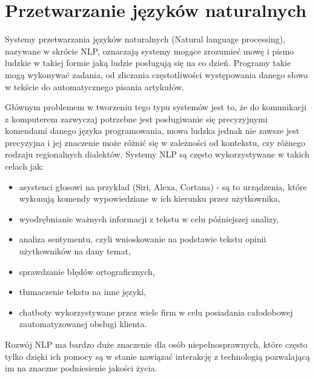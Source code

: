 
\chapter{Przetwarzanie języków naturalnych}
Systemy przetwarzania języków naturalnych (Natural language processing), nazywane 
w skrócie NLP, oznaczają systemy mogące zrozumieć mowę i pismo ludzkie w takiej
formie jaką ludzie posługują się na co dzień. Programy takie mogą wykonywać zadania, od zliczania
częstotliwości występowania danego słowa w tekście do automatycznego pisania artykułów. 

Głównym problemem w tworzeniu tego typu systemów jest to, że do komunikacji z komputerem zazwyczaj
potrzebne jest posługiwanie się precyzyjnymi komendami danego języka programowania, mowa ludzka
jednak nie zawsze jest precyzyjna i jej znaczenie może różnić się w zależności od kontekstu, czy
różnego rodzaju regionalnych dialektów. Systemy NLP są często wykorzystywane w takich 
celach jak:
\begin{itemize}
    \item asystenci głosowi na przykład (Siri, Alexa, Cortana) - są to urządzenia, które 
    wykonują komendy wypowiedziane w ich kierunku przez użytkownika,
    \item wyodrębnianie ważnych informacji z tekstu w celu późniejszej analizy,
    \item analiza sentymentu, czyli wnioskowanie na podstawie tekstu opinii użytkowników na dany temat,
    \item sprawdzanie błędów ortograficznych,
    \item tłumaczenie tekstu na inne języki,
    \item chatboty wykorzystywane przez wiele firm w celu posiadania całodobowej zautomatyzowanej obsługi klienta.
\end{itemize}
Rozwój NLP ma bardzo duże znaczenie dla osób niepełnosprawnych, które często tylko dzięki ich pomocy są 
w stanie nawiązać interakcję z technologią pozwalającą im na znaczne podniesienie jakości życia. ~\cite{TextProcessing}
